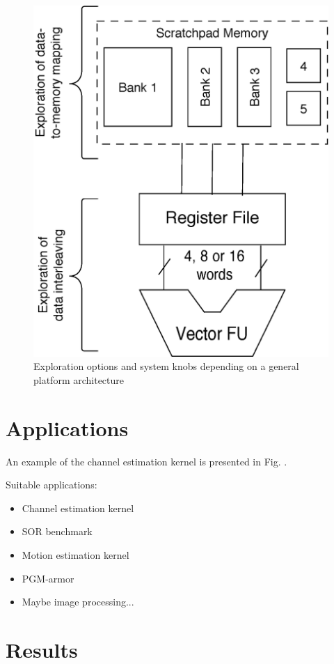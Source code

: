 \documentclass[prodmode,acmtodaes]{acmsmall}
\begin{document}
\begin{figure}
\centering
	\label{arch}
	\caption{Exploration options and system knobs depending on a general platform architecture}
	\includegraphics[scale = 0.5]{Images/Architecture.eps} 
\end{figure}

\section{Applications}

An example of the channel estimation kernel is presented in Fig. .

Suitable applications:
\begin{itemize}
\item Channel estimation kernel
\item SOR benchmark
\item Motion estimation kernel
\item PGM-armor
\item Maybe image processing...
\end{itemize}

\section{Results}
\end{document}
